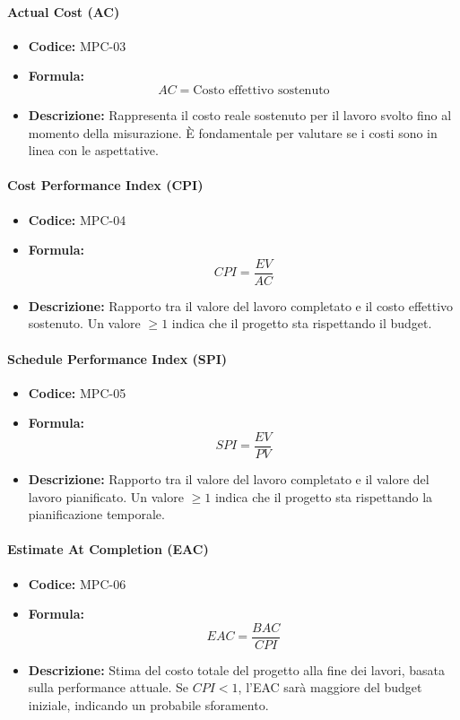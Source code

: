 \documentclass[a4paper, 11pt]{article}
\begin{document}
\paragraph{Actual Cost (AC)}
\begin{itemize}
    \item \textbf{Codice:} MPC-03 
    \item \textbf{Formula:} $$AC = \text{Costo effettivo sostenuto}$$
    \item \textbf{Descrizione:} Rappresenta il costo reale sostenuto per il lavoro svolto fino al momento della misurazione. È fondamentale per valutare se i costi sono in linea con le aspettative.
\end{itemize}

\paragraph{Cost Performance Index (CPI)}
\begin{itemize}
    \item \textbf{Codice:} MPC-04 
    \item \textbf{Formula:} $$CPI = \frac{EV}{AC}$$
    \item \textbf{Descrizione:} Rapporto tra il valore del lavoro completato e il costo effettivo sostenuto. Un valore $\ge 1$ indica che il progetto sta rispettando il budget.
\end{itemize}

\paragraph{Schedule Performance Index (SPI)}
\begin{itemize}
    \item \textbf{Codice:} MPC-05 
    \item \textbf{Formula:} $$SPI = \frac{EV}{PV}$$
    \item \textbf{Descrizione:} Rapporto tra il valore del lavoro completato e il valore del lavoro pianificato. Un valore $\ge 1$ indica che il progetto sta rispettando la pianificazione temporale.
\end{itemize}

\paragraph{Estimate At Completion (EAC)}
\begin{itemize}
    \item \textbf{Codice:} MPC-06 
    \item \textbf{Formula:} $$EAC = \frac{BAC}{CPI}$$
    \item \textbf{Descrizione:} Stima del costo totale del progetto alla fine dei lavori, basata sulla performance attuale. Se $CPI < 1$, l'EAC sarà maggiore del budget iniziale, indicando un probabile sforamento.
\end{itemize}
\end{document}
